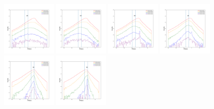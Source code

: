 \documentclass[12pt,prd]{article}
\begin{document}
\begin{figure}[h!]
\includegraphics[width=0.24\textwidth]{../figures/scanning_plotsgaiascan_l101_2_b58_4_ra212_7_dec55_2_npy_6.pdf}
\includegraphics[width=0.24\textwidth]{../figures/scanning_plotsgaiascan_l101_2_b58_4_ra212_7_dec55_2_npy_7.pdf}
\includegraphics[width=0.24\textwidth]{../figures/scanning_plotsgaiascan_l101_2_b58_4_ra212_7_dec55_2_npy_8.pdf}
\includegraphics[width=0.24\textwidth]{../figures/scanning_plotsgaiascan_l101_2_b58_4_ra212_7_dec55_2_npy_9.pdf}
\includegraphics[width=0.24\textwidth]{../figures/scanning_plotsgaiascan_l101_2_b58_4_ra212_7_dec55_2_npy_10.pdf}
\includegraphics[width=0.24\textwidth]{../figures/scanning_plotsgaiascan_l101_2_b58_4_ra212_7_dec55_2_npy_11.pdf}

\end{figure}
\end{document}
